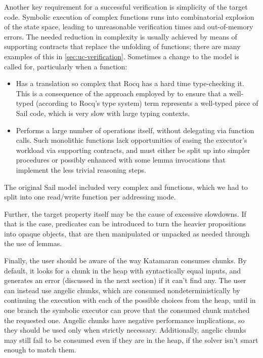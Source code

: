 Another key requirement for a successful verification is simplicity of the target code. Symbolic execution of complex functions runs into combinatorial explosion of the state space, leading to unreasonable verification times and out-of-memory errors. The needed reduction in complexity is usually achieved by means of supporting contracts that replace the unfolding of functions; there are many examples of this in \cref{sec:uc-verification}. Sometimes a change to the model is called for, particularly when a function:
\begin{itemize}
\item Has a \usail translation so complex that Rocq has a hard time type-checking it. This is a consequence of the approach employed by \usail to ensure that a well-typed (according to Rocq's type system) \usail term represents a well-typed piece of Sail code, which is very slow with large typing contexts.
\item Performs a large number of operations itself, without delegating via function calls. Such monolithic functions lack opportunities of easing the executor's workload via supporting contracts, and must either be split up into simpler procedures or possibly enhanced with some lemma invocations that implement the less trivial reasoning steps.
\end{itemize}
The original Sail model included very complex  and  functions, which we had to split into one read/write function per addressing mode.

Further, the target property itself may be the cause of excessive slowdowns. If that is the case, predicates can be introduced to turn the heavier propositions into opaque objects, that are then manipulated or unpacked as needed through the use of lemmas.

Finally, the user should be aware of the way Katamaran consumes chunks. By default, it looks for a chunk in the heap with syntactically equal inputs, and generates an error (discussed in the next section) if it can't find any. The user can instead use angelic chunks, which are consumed nondeterministically by continuing the execution with each of the possible choices from the heap, until in one branch the symbolic executor can prove that the consumed chunk matched the requested one. Angelic chunks have negative performance implications, so they should be used only when strictly necessary. Additionally, angelic chunks may still fail to be consumed even if they are in the heap, if the solver isn't smart enough to match them.

